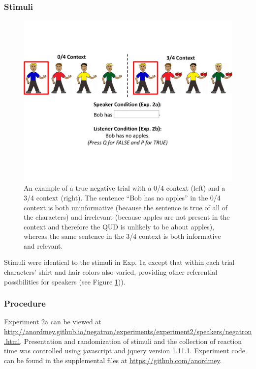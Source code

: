 \documentclass[man, floatsintext, noapacite]{apa6}
\begin{document}
\subsubsection{Stimuli}

\begin{figure}[t]
\begin{center} 
\includegraphics[width=6in]{figures/experiment2/trialfig_exp2.pdf}
\caption{\label{fig:exp2_trial} An example of a true negative trial with a 0/4 context (left) and a 3/4 context (right).  The sentence ``Bob has no apples'' in the 0/4 context is both uninformative (because the sentence is true of all of the characters) and irrelevant (because apples are not present in the context and therefore the QUD is unlikely to be about apples), whereas the same sentence in the 3/4 context is both informative and relevant. }
\vspace{-5mm}
\end{center} 
\end{figure}

Stimuli were identical to the stimuli in Exp. 1a except that within each trial characters' shirt and hair colors also varied, providing other referential possibilities for speakers (see Figure \ref{fig:exp2_trial})). 

\subsubsection{Procedure}

Experiment 2a can be viewed at \url{http://anordmey.github.io/negatron/experiments/experiment2/speakers/negatron.html}. Presentation and randomization of stimuli and the collection of reaction time was controlled using javascript and jquery version 1.11.1. Experiment code can be found in the supplemental files at  \url{https://github.com/anordmey}.
\end{document}
